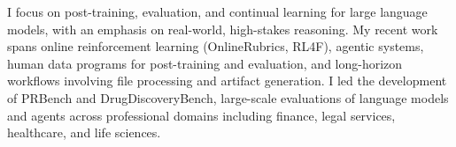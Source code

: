 
I focus on post-training, evaluation, and continual learning for large language models, with an emphasis on real-world, high-stakes reasoning. My recent work spans online reinforcement learning (OnlineRubrics, RL4F), agentic systems, human data programs for post-training and evaluation, and long-horizon workflows involving file processing and artifact generation. I led the development of PRBench and DrugDiscoveryBench, large-scale evaluations of language models and agents across professional domains including finance, legal services, healthcare, and life sciences.




